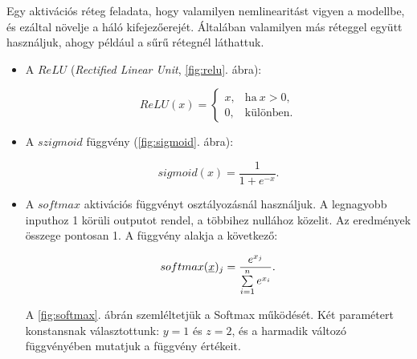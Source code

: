 
Egy aktivációs réteg feladata, hogy valamilyen nemlinearitást vigyen a modellbe, és ezáltal növelje a háló 
kifejezőerejét. Általában valamilyen más réteggel együtt használjuk, ahogy például a sűrű rétegnél láthattuk.


\begin{itemize}
	

	\item
	A $ ReLU $ (\textit{Rectified Linear Unit}, \ref{fig:relu}. ábra):
	
	\[  ReLU(x) =  
	\begin{cases}
	x, & \text{ha}\ x > 0, \\
	0, & \text{különben}.
	\end{cases} 
	\]
	
	\item
	A $ szigmoid $ függvény (\ref{fig:sigmoid}. ábra):
		
	\[  sigmoid(x) = \dfrac{1}{1 + e^{-x}}  . \]
	
	
	

	
	\item
	A $ softmax $ aktivációs függvényt osztályozásnál használjuk. A legnagyobb inputhoz 1 körüli outputot rendel, a többihez nullához közelit. Az eredmények összege pontosan 1. A függvény alakja a következő:
	
	\[  softmax(\underline{x})_j = \dfrac{e^{x_j}}{\sum\limits_{{i}=1}^{n}e^{x_i}}  .\]
	
	A \ref{fig:softmax}. ábrán szemléltetjük a Softmax működését. Két paramétert konstansnak választottunk: $ y=1 $ és $ z=2 $, és a harmadik változó függvényében mutatjuk a függvény értékeit.
	
%		
%		
	\begin{figure} [h!]
		

\end{figure}
\end{itemize}

